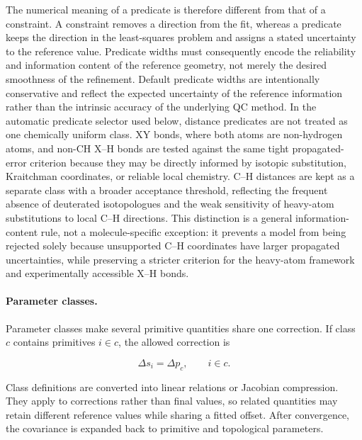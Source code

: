 \documentclass[aip,jcp,reprint,longbibliography,floatfix]{revtex4-2}
\begin{document}
The numerical meaning of a predicate is therefore different from that of a
constraint. A constraint removes a direction from the fit, whereas a predicate
keeps the direction in the least-squares problem and assigns a stated
uncertainty to the reference value. Predicate widths must consequently encode
the reliability and information content of the reference geometry, not merely
the desired smoothness of the refinement. Default predicate widths are
intentionally conservative and reflect the expected uncertainty of the
reference information rather than the intrinsic accuracy of the underlying QC
method. In the automatic predicate selector
used below, distance predicates are not treated as one chemically uniform
class. XY bonds, where both atoms are non-hydrogen atoms, and non-CH X--H bonds
are tested against the same tight propagated-error criterion because they may
be directly informed by isotopic substitution, Kraitchman coordinates, or
reliable local chemistry. C--H distances are kept as a separate class with a
broader acceptance threshold, reflecting the frequent absence of deuterated
isotopologues and the weak sensitivity of heavy-atom substitutions to local
C--H directions. This distinction is a general information-content rule, not a
molecule-specific exception: it prevents a model from being rejected solely
because unsupported C--H coordinates have larger propagated uncertainties,
while preserving a stricter criterion for the heavy-atom framework and
experimentally accessible X--H bonds.

\paragraph{Parameter classes.}

Parameter classes make several primitive quantities share one correction. If
class $c$ contains primitives $i\in c$, the allowed correction is

\begin{equation}
\Delta s_i
=
\Delta p_c,
\qquad
i\in c .
\end{equation}

Class definitions are converted into linear relations or Jacobian compression.
They apply to corrections rather than final values, so related quantities may
retain different reference values while sharing a fitted offset. After
convergence, the covariance is expanded back to primitive and topological
parameters.
\end{document}
